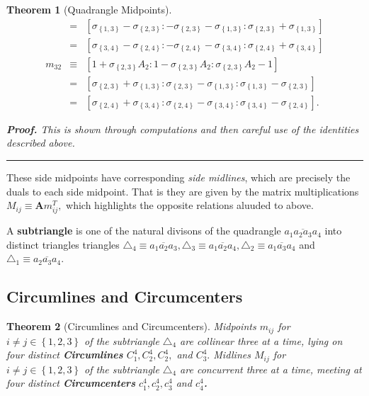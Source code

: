 \documentclass{unswthesis}
\newtheorem{theorem}{Theorem}
\newenvironment{proof}[1][Proof]{\noindent\textbf{#1.} }{\ \rule{0.5em}{0.5em}}
\begin{document}
\begin{theorem}[Quadrangle Midpoints]
\begin{eqnarray*}
&=&\left[ \sigma _{\left\{ 1,3\right\} }-\sigma _{\left\{ 2,3\right\}
}:-\sigma _{\left\{ 2,3\right\} }-\sigma _{\left\{ 1,3\right\} }:\sigma
_{\left\{ 2,3\right\} }+\sigma _{\left\{ 1,3\right\} }\right]  \\
&=&\left[ \sigma _{\left\{ 3,4\right\} }-\sigma _{\left\{ 2,4\right\}
}:-\sigma _{\left\{ 2,4\right\} }-\sigma _{\left\{ 3,4\right\} }:\sigma
_{\left\{ 2,4\right\} }+\sigma _{\left\{ 3,4\right\} }\right]  \\
m_{32} &\equiv &\left[ 1+\sigma _{\left\{ 2,3\right\} }A_{2}:1-\sigma
_{\left\{ 2,3\right\} }A_{2}:\sigma _{\left\{ 2,3\right\} }A_{2}-1\right]  \\
&=&\left[ \sigma _{\left\{ 2,3\right\} }+\sigma _{\left\{ 1,3\right\}
}:\sigma _{\left\{ 2,3\right\} }-\sigma _{\left\{ 1,3\right\} }:\sigma
_{\left\{ 1,3\right\} }-\sigma _{\left\{ 2,3\right\} }\right]  \\
&=&\left[ \sigma _{\left\{ 2,4\right\} }+\sigma _{\left\{ 3,4\right\}
}:\sigma _{\left\{ 2,4\right\} }-\sigma _{\left\{ 3,4\right\} }:\sigma
_{\left\{ 3,4\right\} }-\sigma _{\left\{ 2,4\right\} }\right] .
\end{eqnarray*}

\begin{proof}
This is shown through computations and then careful use of the identities
described above.$\ $
\end{proof}
\end{theorem}

These side midpoints have corresponding \textit{side midlines}, which are
precisely the duals to each side midpoint. That is they are given by the
matrix multiplications $M_{ij}\equiv \mathbf{A}m_{ij}^{T},$ which highlights
the opposite relations aluuded to above.

A \textbf{subtriangle} is one of the natural divisons of the quadrangle $%
\overline{a_{1}a_{2}a_{3}a_{4}}$ into distinct triangles triangles $%
\triangle _{4}\equiv \overline{a_{1}a_{2}a_{3}},\triangle _{3}\equiv 
\overline{a_{1}a_{2}a_{4}},\triangle _{2}\equiv \overline{a_{1}a_{3}a_{4}}$
and $\triangle _{1}\equiv \overline{a_{2}a_{3}a_{4}}$.

\bigskip

\subsection{Circumlines and Circumcenters}

\begin{theorem}[Circumlines and Circumcenters]
Midpoints $m_{ij}$ for $i\neq j\in \left\{ 1,2,3\right\} $ of the
subtriangle $\triangle _{4}$ are collinear three at a time, lying on four
distinct \textbf{Circumlines} $C_{1}^{4},C_{2}^{4},C_{2}^{4},$ and $%
C_{3}^{4}.$ Midlines $M_{ij}$ for $i\neq j\in \left\{ 1,2,3\right\} $ of the
subtriangle $\triangle _{4}$ are concurrent three at a time, meeting at four
distinct \textbf{Circumcenters} $c_{1}^{4},c_{2}^{4},c_{3}^{4}$ and $%
c_{4}^{4}$\textbf{.}
\end{theorem}
\end{document}
